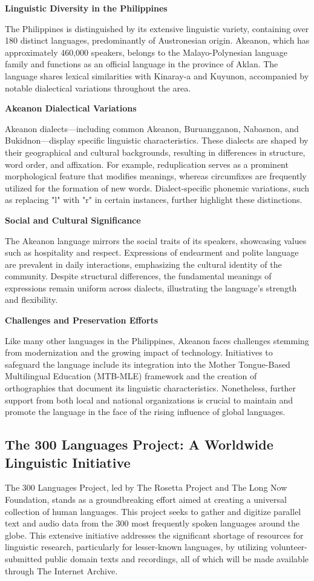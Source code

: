 \textbf{Linguistic Diversity in the Philippines}

The Philippines is distinguished by its extensive linguistic variety, containing over 180 distinct languages, predominantly of Austronesian origin. Akeanon, which has approximately 460,000 speakers, belongs to the Malayo-Polynesian language family and functions as an official language in the province of Aklan. The language shares lexical similarities with Kinaray-a and Kuyunon, accompanied by notable dialectical variations throughout the area.

\textbf{Akeanon Dialectical Variations}

Akeanon dialects—including common Akeanon, Buruangganon, Nabasnon, and Bukidnon—display specific linguistic characteristics. These dialects are shaped by their geographical and cultural backgrounds, resulting in differences in structure, word order, and affixation. For example, reduplication serves as a prominent morphological feature that modifies meanings, whereas circumfixes are frequently utilized for the formation of new words. Dialect-specific phonemic variations, such as replacing "l" with "r" in certain instances, further highlight these distinctions.

\textbf{Social and Cultural Significance}

The Akeanon language mirrors the social traits of its speakers, showcasing values such as hospitality and respect. Expressions of endearment and polite language are prevalent in daily interactions, emphasizing the cultural identity of the community. Despite structural differences, the fundamental meanings of expressions remain uniform across dialects, illustrating the language’s strength and flexibility.

\textbf{Challenges and Preservation Efforts}

Like many other languages in the Philippines, Akeanon faces challenges stemming from modernization and the growing impact of technology. Initiatives to safeguard the language include its integration into the Mother Tongue-Based Multilingual Education (MTB-MLE) framework and the creation of orthographies that document its linguistic characteristics. Nonetheless, further support from both local and national organizations is crucial to maintain and promote the language in the face of the rising influence of global languages.

\subsection{The 300 Languages Project: A Worldwide Linguistic Initiative}
The 300 Languages Project, led by The Rosetta Project and The Long Now Foundation, stands as a groundbreaking effort aimed at creating a universal collection of human languages. This project seeks to gather and digitize parallel text and audio data from the 300 most frequently spoken languages around the globe. This extensive initiative addresses the significant shortage of resources for linguistic research, particularly for lesser-known languages, by utilizing volunteer-submitted public domain texts and recordings, all of which will be made available through The Internet Archive.

